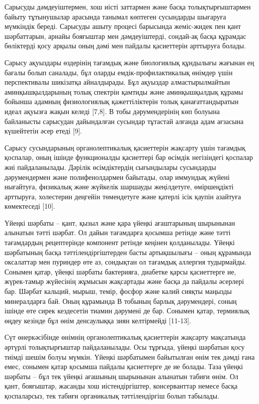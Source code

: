 {{Сарысуды дәмдеуіштермен, хош иісті заттармен және басқа
толықтырғыштармен байыту тұтынушылар арасында танымал көптеген
сусындарды шығаруға мүмкіндік береді. Сарысуды ашыту процесі барысында
жеміс-жидек пен қант шәрбаттарын, арнайы бояғыштар мен дәмдеуіштерді,
сондай-ақ басқа құрамдас бөліктерді қосу арқылы оның дәмі мен пайдалы
қасиеттерін арттыруға болады.

Сарысу ақуыздары өздерінің тағамдық және биологиялық құндылығы жағынан
ең бағалы болып саналады, бұл оларды емдік-профилактикалық өнімдер үшін
перспективалы шикізатқа айналдырады. Бұл ақуыздар алмастырылмайтын
аминқышқылдарының толық спектрін қамтиды және аминқышқылдық құрамы
бойынша адамның физиологиялық қажеттіліктерін толық қанағаттандыратын
идеал ақуызға жақын келеді {[}7,8{]}. В тобы дәрумендерінің көп болуына
байланысты сарысудан дайындалған сусындар тұтастай алғанда адам ағзасына
күшейтетін әсер етеді {[}9{]}.

Сарысу сусындарының органолептикалық қасиеттерін жақсарту үшін тағамдық
қоспалар, оның ішінде функционалды қасиеттері бар өсімдік негізіндегі
қоспалар жиі пайдаланылады. Дәрілік өсімдіктердің сығындылары сусындарды
дәрумендермен және полифенолдармен байытады, олар иммундық жүйені
нығайтуға, физикалық және жүйкелік шаршауды жеңілдетуге, өміршеңдікті
арттыруға, холестерин деңгейін төмендетуге және қатерлі ісік қаупін
азайтуға көмектеседі {[}10{]}.

Үйеңкі шәрбаты -- қант, қызыл және қара үйеңкі ағаштарының шырынынан
алынатын тәтті шәрбат. Ол дайын тағамдарға қосымша ретінде және тәтті
тағамдардың рецептерінде компонент ретінде кеңінен қолданылады. Үйеңкі
шәрбатының басқа тәттілендіргіштерден басты артықшылығы -- оның
құрамында оксалаттар мен пуриндер өте аз, сондықтан ол тағамдық аллергия
тудырмайды. Сонымен қатар, үйеңкі шәрбаты бактерияға, диабетке қарсы
қасиеттерге ие, жүрек-тамыр жүйесінің жұмысын жақсартады және басқа да
пайдалы әсерлері бар. Шәрбат кальций, мырыш, темір, фосфор және калий
сияқты маңызды минералдарға бай. Оның құрамында В тобының барлық
дәрумендері, соның ішінде өте сирек кездесетін тиамин дәрумені де бар.
Сонымен қатар, термиялық өңдеу кезінде бұл өнім денсаулыққа зиян
келтірмейді {[}11-13{]}.

Сүт өнеркәсібінде өнімнің органолептикалық қасиеттерін жақсарту
мақсатында әртүрлі толықтырғыштар пайдаланылады. Осы тұрғыда, үйеңкі
шәрбатын қосу тиімді шешім болуы мүмкін. Үйеңкі шәрбатымен байытылған
өнім тек дәмді ғана емес, сонымен қатар қосымша пайдалы қасиеттерге де
ие болады. Таза үйеңкі шәрбаты -- бұл тек үйеңкі ағашының шырынынан
алынатын табиғи өнім. Ол қант, бояғыштар, жасанды хош иістендіргіштер,
консерванттар немесе басқа қоспаларсыз, тек табиғи органикалық
тәттілендіргіш болып табылады.

}}
